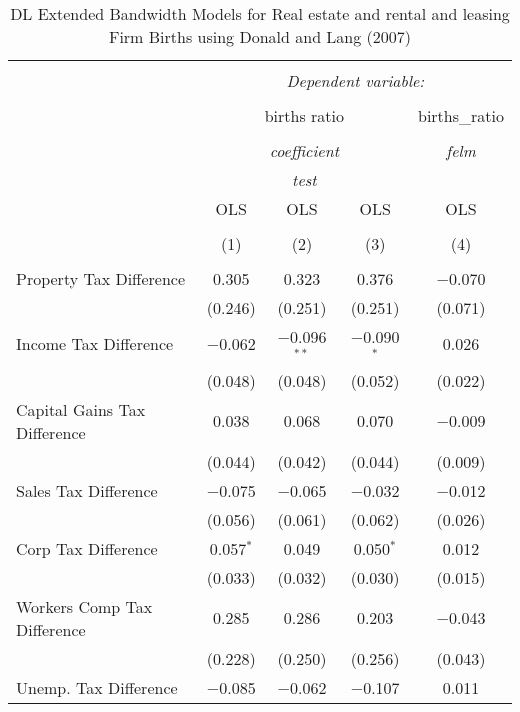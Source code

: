 
\begin{table}[!htbp] \centering 
  \caption{DL Extended Bandwidth Models for  Real estate and rental and leasing Firm Births using Donald and Lang (2007)} 
  \label{} 
\begin{tabular}{@{\extracolsep{5pt}}lcccc} 
\\[-1.8ex]\hline 
\hline \\[-1.8ex] 
 & \multicolumn{4}{c}{\textit{Dependent variable:}} \\ 
\cline{2-5} 
\\[-1.8ex] & \multicolumn{3}{c}{births ratio} & births\_ratio \\ 
\\[-1.8ex] & \multicolumn{3}{c}{\textit{coefficient}} & \textit{felm} \\ 
 & \multicolumn{3}{c}{\textit{test}} & \textit{} \\ 
 & OLS & OLS & OLS & OLS \\ 
\\[-1.8ex] & (1) & (2) & (3) & (4)\\ 
\hline \\[-1.8ex] 
 Property Tax Difference & 0.305 & 0.323 & 0.376 & $-$0.070 \\ 
  & (0.246) & (0.251) & (0.251) & (0.071) \\ 
  Income Tax Difference & $-$0.062 & $-$0.096$^{**}$ & $-$0.090$^{*}$ & 0.026 \\ 
  & (0.048) & (0.048) & (0.052) & (0.022) \\ 
  Capital Gains Tax Difference & 0.038 & 0.068 & 0.070 & $-$0.009 \\ 
  & (0.044) & (0.042) & (0.044) & (0.009) \\ 
  Sales Tax Difference & $-$0.075 & $-$0.065 & $-$0.032 & $-$0.012 \\ 
  & (0.056) & (0.061) & (0.062) & (0.026) \\ 
  Corp Tax Difference & 0.057$^{*}$ & 0.049 & 0.050$^{*}$ & 0.012 \\ 
  & (0.033) & (0.032) & (0.030) & (0.015) \\ 
  Workers Comp Tax Difference & 0.285 & 0.286 & 0.203 & $-$0.043 \\ 
  & (0.228) & (0.250) & (0.256) & (0.043) \\ 
  Unemp. Tax Difference & $-$0.085 & $-$0.062 & $-$0.107 & 0.011 \\ 

\end{tabular}
\end{table}
